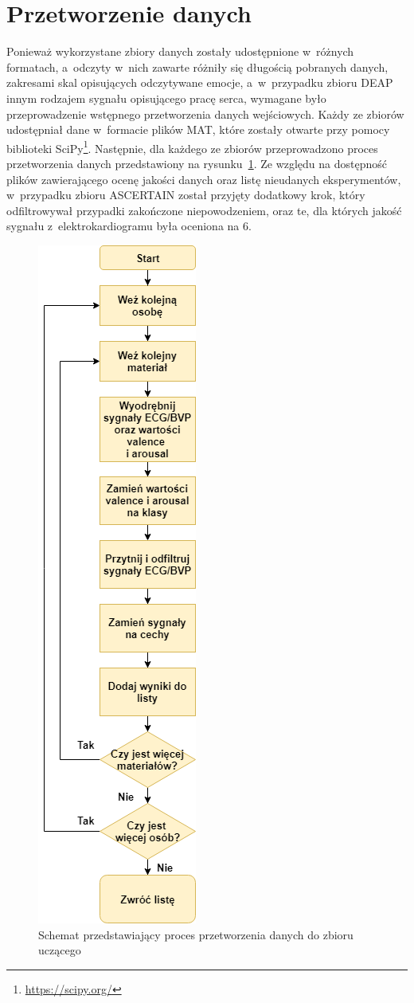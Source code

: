 \section{Przetworzenie danych}
Ponieważ wykorzystane zbiory danych zostały udostępnione w~różnych formatach, a~odczyty w~nich zawarte różniły się długością pobranych danych, zakresami skal opisujących odczytywane emocje, a~w~przypadku zbioru DEAP innym rodzajem sygnału opisującego pracę serca, wymagane było przeprowadzenie wstępnego przetworzenia danych wejściowych. Każdy ze zbiorów udostępniał dane w~formacie plików MAT, które zostały otwarte przy pomocy biblioteki SciPy\footnote{\url{https://scipy.org/}}. Następnie, dla każdego ze zbiorów przeprowadzono proces przetworzenia danych przedstawiony na rysunku~\ref{fig:preprocessing_flow}. Ze względu na dostępność plików zawierającego ocenę jakości danych oraz listę nieudanych eksperymentów, w~przypadku zbioru ASCERTAIN został przyjęty dodatkowy krok, który odfiltrowywał przypadki zakończone niepowodzeniem, oraz te, dla których jakość sygnału z~elektrokardiogramu była oceniona na 6.
\begin{figure}[!t]
	\centering
	\includegraphics[width=0.25\linewidth]{images/preprocessing_flow.png}
	\caption{Schemat przedstawiający proces przetworzenia danych do zbioru uczącego}
	\label{fig:preprocessing_flow}
\end{figure}

